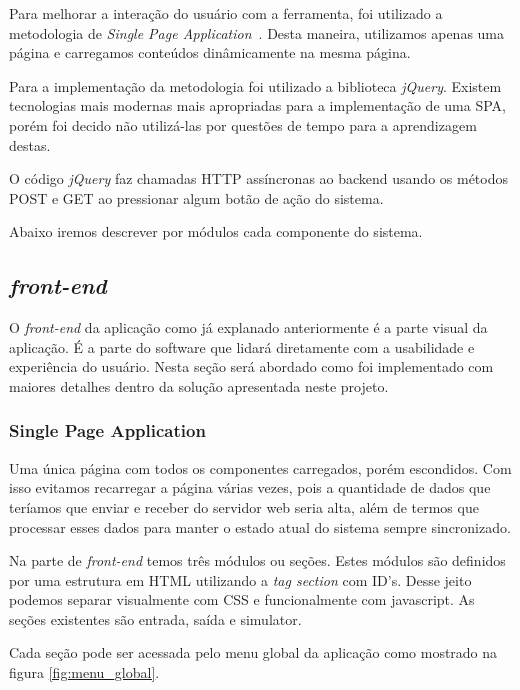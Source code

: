 	Para melhorar a interação do usuário com a ferramenta, foi utilizado a metodologia de \textit{Single Page Application}~\cite{mikowski2013single}. Desta maneira, utilizamos apenas uma página e carregamos conteúdos dinâmicamente na mesma página.

	Para a implementação da metodologia foi utilizado a biblioteca \textit{jQuery}. Existem tecnologias mais modernas mais apropriadas para a implementação de uma SPA, porém foi decido não utilizá-las por questões de tempo para a aprendizagem destas.

	O código \textit{jQuery} faz chamadas HTTP assíncronas ao backend usando os métodos POST e GET ao pressionar algum botão de ação do sistema. 

	Abaixo iremos descrever por módulos cada componente do sistema.
	
	\subsection{\textit{front-end}}
	
		O \textit{front-end} da aplicação como já explanado anteriormente é a parte visual da aplicação. É a parte do software que lidará diretamente com a usabilidade e experiência do usuário. Nesta seção será abordado como foi implementado com maiores detalhes dentro da solução apresentada neste projeto.

		\subsubsection{Single Page Application}
		
			Uma única página com todos os componentes carregados, porém escondidos. Com isso evitamos recarregar a página várias vezes, pois a quantidade de dados que teríamos que  enviar e receber do servidor web seria alta, além de termos que processar esses dados para manter o estado atual do sistema sempre sincronizado.

			Na parte de \textit{front-end} temos três módulos ou seções. Estes módulos são definidos por uma estrutura em HTML utilizando a \textit{tag section} com ID's. Desse jeito podemos separar visualmente com CSS e funcionalmente com javascript. As seções existentes são entrada, saída e simulator.

			Cada seção pode ser acessada pelo menu global da aplicação como mostrado na figura \ref{fig:menu_global}.

